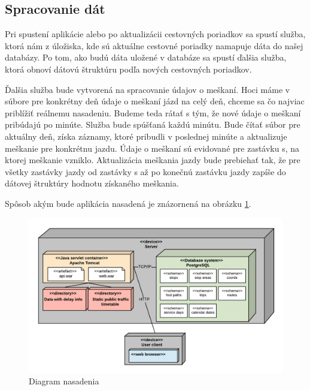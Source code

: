 \subsection{Spracovanie dát}
Pri spustení aplikácie alebo po aktualizácii cestovných poriadkov sa spustí služba, ktorá nám z úložiska, kde sú aktuálne cestovné poriadky namapuje dáta do našej databázy. Po tom, ako budú dáta uložené v databáze sa spustí ďalšia služba, ktorá obnoví dátovú štruktúru podľa nových cestovných poriadkov. 

Ďalšia služba bude vytvorená na spracovanie údajov o meškaní. Hoci máme v súbore pre konkrétny deň údaje o meškaní jázd na celý deň, chceme sa čo najviac priblížiť reálnemu nasadeniu. Budeme teda rátať s tým, že nové údaje o meškaní pribúdajú po minúte. Služba bude spúšťaná každú minútu. Bude čítať súbor pre aktuálny deň, získa záznamy, ktoré pribudli v poslednej minúte a aktualizuje meškanie pre konkrétnu jazdu. Údaje o meškaní sú evidované pre zastávku s, na ktorej meškanie vzniklo. Aktualizácia meškania jazdy bude prebiehať tak, že pre všetky zastávky jazdy od zastávky s až po konečnú zastávku jazdy zapíše do dátovej štruktúry hodnotu získaného meškania.

Spôsob akým bude aplikácia nasadená je znázornená na obrázku \ref{fig:deploymentDiagram}.

\begin{figure}[H]
\centerline{\includegraphics[width=1.1\textwidth]{images/deployment-diagram}}
\caption[Diagram nasadenia]{Diagram nasadenia}
\label{fig:deploymentDiagram}
\end{figure}



